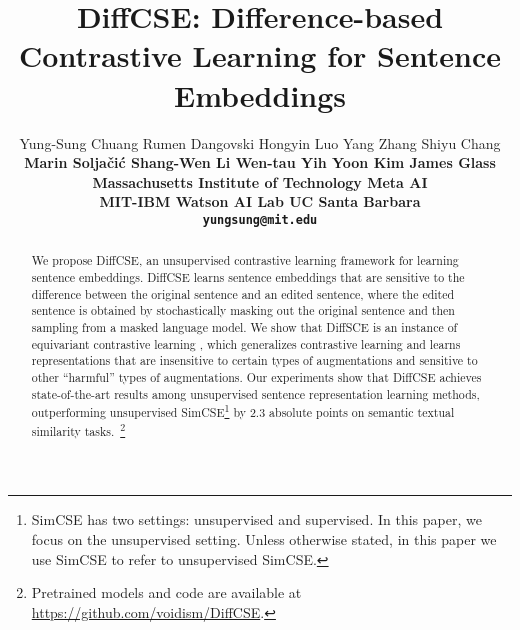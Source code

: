 \documentclass[11pt]{article}
\title{DiffCSE: Difference-based Contrastive Learning for Sentence Embeddings}
\author{Yung-Sung Chuang \quad Rumen Dangovski \quad Hongyin Luo \quad Yang Zhang \quad Shiyu Chang \\
\bf Marin Solja\v{c}i\'{c} \quad Shang-Wen Li \quad Wen-tau Yih \quad Yoon Kim \quad James Glass \\
  Massachusetts Institute of Technology \quad
  Meta AI \\
  MIT-IBM Watson AI Lab \quad UC Santa Barbara \\
  \texttt{yungsung@mit.edu} \\
    }
\newcommand{\diffcse}{DiffCSE\xspace}
\begin{document}
\maketitle
\begin{abstract}
\vspace{-1mm}
We propose \diffcse, an unsupervised contrastive learning framework for learning sentence embeddings. \diffcse learns sentence embeddings that are sensitive to the difference between the original sentence and an edited sentence, where the edited sentence is obtained by stochastically masking out the original sentence and then sampling from a masked language model. We show that DiffSCE is an instance of equivariant contrastive learning \cite{dangovski2021equivariant}, which generalizes contrastive learning and learns representations that are insensitive to certain types of augmentations and sensitive to other ``harmful'' types of augmentations. Our experiments show that DiffCSE achieves state-of-the-art results among unsupervised sentence representation learning methods, outperforming unsupervised SimCSE\footnote{SimCSE has two settings: unsupervised and supervised. In this paper, we focus on the unsupervised setting. Unless otherwise stated, in this paper we use SimCSE to refer to unsupervised SimCSE.} by 2.3 absolute points on semantic textual similarity tasks.~\footnote{Pretrained models and code are available at {\url{https://github.com/voidism/DiffCSE}}.}
\vspace{-2mm}
\end{abstract}
\vspace{-1mm}
\end{document}
